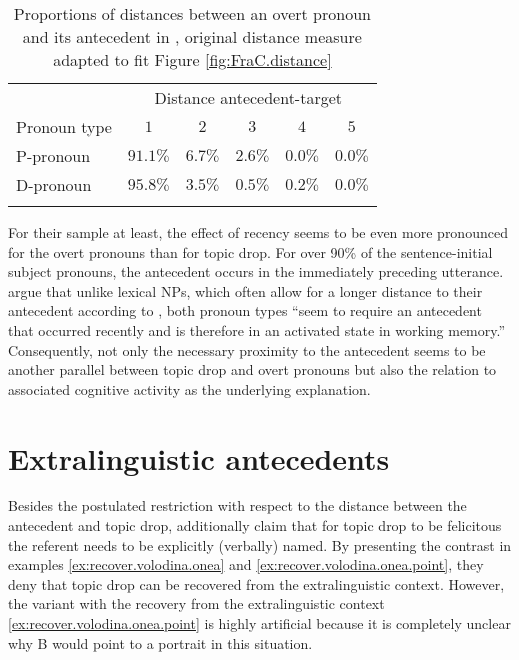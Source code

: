 \begin{table}
\centering
\caption[Proportions of distances between overt pronoun and antecedent in \citet{portele.bader2016}.]{Proportions of distances between an overt pronoun and its antecedent in \citet[16]{portele.bader2016}, original distance measure adapted to fit Figure \ref{fig:FraC.distance}}
\begin{tabular}{lccccc}
\lsptoprule
 & \multicolumn{5}{c}{Distance antecedent-target}\\
\multirow{-2}{*}{Pronoun type} & $1$ & $2$ & $3$ & $4$ & $5$\\
\midrule
P-pronoun & $91.1\%$ & \phantom{2}$6.7\%$ & \phantom{2}$2.6\%$ & \phantom{2}$0.0\%$& \phantom{2}$0.0\%$\\
D-pronoun & $95.8\%$ & \phantom{2}$3.5\%$ & \phantom{2}$0.5\%$ & \phantom{2}$0.2\%$ & \phantom{2}$0.0\%$\\
\lspbottomrule
\end{tabular}
\label{tab:portele.bader}
\end{table}

For their sample at least, the effect of recency seems to be even more pronounced for the overt pronouns than for topic drop.
For over 90\% of the sentence-initial subject pronouns, the antecedent occurs in the immediately preceding utterance.
\citet[19]{portele.bader2016} argue that unlike lexical NPs, which often allow for a longer distance to their antecedent according to \citet{arnold2010}, both pronoun types ``seem to require an antecedent that occurred recently and is therefore in an activated state in working memory.''
Consequently, not only the necessary proximity to the antecedent seems to be another parallel between topic drop and overt pronouns but also the relation to associated cognitive activity as the underlying explanation.

\section{Extralinguistic antecedents}\label{sec:recover.extra}
Besides the postulated restriction with respect to the distance between the antecedent and topic drop, \citet[217]{volodina.onea2012} additionally claim that for topic drop to be felicitous the referent needs to be explicitly (verbally) named.
By presenting  the contrast in examples \ref{ex:recover.volodina.onea} and \ref{ex:recover.volodina.onea.point}, they deny that topic drop can be recovered from the extralinguistic context.
However, the variant with the recovery from the extralinguistic context \ref{ex:recover.volodina.onea.point} is highly artificial because it is completely unclear why B would point to a portrait in this situation. 

